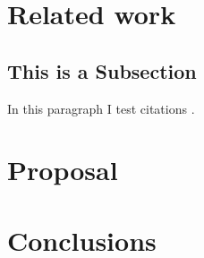 \section{Related work}
\subsection{This is a Subsection}

In this paragraph I test citations \cite{Jentzsch_2014}.

\section{Proposal}

\section{Conclusions}




